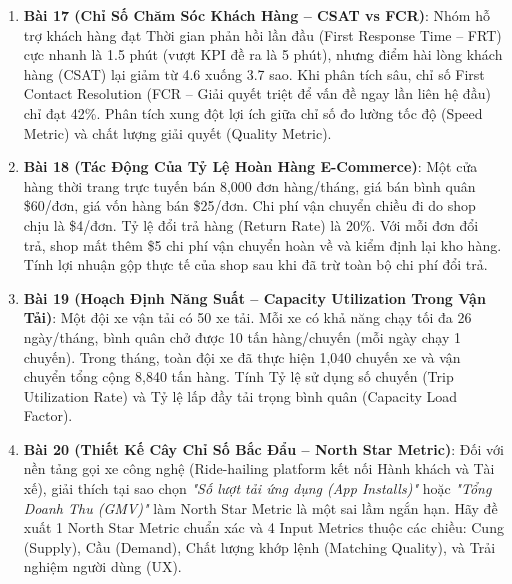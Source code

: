 \begin{baitapbox}
\begin{enumerate}
\begin{itemize}
        \item Khách hàng cũ hạ gói (Contraction MRR): -\$6,000
        \item Khách hàng hủy hợp đồng hoàn toàn (Churn MRR): -\$10,000
        \item Khách hàng hoàn toàn mới (New MRR): +\$30,000
    \end{itemize}
    Tính Tỷ lệ duy trì doanh thu thuần (NRR) và Chỉ số tăng trưởng nhanh (SaaS Quick Ratio). Doanh nghiệp có đạt tiêu chuẩn tăng trưởng bền vững của các quỹ đầu tư mạo hiểm (NRR $> 100\%$) không?
    \item \textbf{Bài 17 (Chỉ Số Chăm Sóc Khách Hàng -- CSAT vs FCR)}: Nhóm hỗ trợ khách hàng đạt Thời gian phản hồi lần đầu (First Response Time -- FRT) cực nhanh là 1.5 phút (vượt KPI đề ra là 5 phút), nhưng điểm hài lòng khách hàng (CSAT) lại giảm từ 4.6 xuống 3.7 sao. Khi phân tích sâu, chỉ số First Contact Resolution (FCR -- Giải quyết triệt để vấn đề ngay lần liên hệ đầu) chỉ đạt 42\%. Phân tích xung đột lợi ích giữa chỉ số đo lường tốc độ (Speed Metric) và chất lượng giải quyết (Quality Metric).
    \item \textbf{Bài 18 (Tác Động Của Tỷ Lệ Hoàn Hàng E-Commerce)}: Một cửa hàng thời trang trực tuyến bán 8,000 đơn hàng/tháng, giá bán bình quân \$60/đơn, giá vốn hàng bán \$25/đơn. Chi phí vận chuyển chiều đi do shop chịu là \$4/đơn. Tỷ lệ đổi trả hàng (Return Rate) là 20\%. Với mỗi đơn đổi trả, shop mất thêm \$5 chi phí vận chuyển hoàn về và kiểm định lại kho hàng. Tính lợi nhuận gộp thực tế của shop sau khi đã trừ toàn bộ chi phí đổi trả.
    \item \textbf{Bài 19 (Hoạch Định Năng Suất -- Capacity Utilization Trong Vận Tải)}: Một đội xe vận tải có 50 xe tải. Mỗi xe có khả năng chạy tối đa 26 ngày/tháng, bình quân chở được 10 tấn hàng/chuyến (mỗi ngày chạy 1 chuyến). Trong tháng, toàn đội xe đã thực hiện 1,040 chuyến xe và vận chuyển tổng cộng 8,840 tấn hàng. Tính Tỷ lệ sử dụng số chuyến (Trip Utilization Rate) và Tỷ lệ lấp đầy tải trọng bình quân (Capacity Load Factor).
    \item \textbf{Bài 20 (Thiết Kế Cây Chỉ Số Bắc Đẩu -- North Star Metric)}: Đối với nền tảng gọi xe công nghệ (Ride-hailing platform kết nối Hành khách và Tài xế), giải thích tại sao chọn \textit{"Số lượt tải ứng dụng (App Installs)"} hoặc \textit{"Tổng Doanh Thu (GMV)"} làm North Star Metric là một sai lầm ngắn hạn. Hãy đề xuất 1 North Star Metric chuẩn xác và 4 Input Metrics thuộc các chiều: Cung (Supply), Cầu (Demand), Chất lượng khớp lệnh (Matching Quality), và Trải nghiệm người dùng (UX).
\end{enumerate}
\end{baitapbox}

